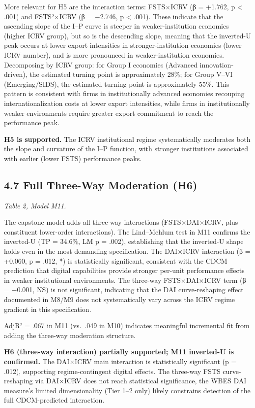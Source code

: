 \documentclass[
  12pt]{article}
\begin{document}
More relevant for H5 are the interaction terms: FSTS×ICRV (β = +1.762, p
\textless{} .001) and FSTS²×ICRV (β = −2.746, p \textless{} .001). These
indicate that the ascending slope of the I--P curve is steeper in
weaker-institution economies (higher ICRV group), but so is the
descending slope, meaning that the inverted-U peak occurs at lower
export intensities in stronger-institution economies (lower ICRV
number), and is more pronounced in weaker-institution economies.
Decomposing by ICRV group: for Group I economies (Advanced
innovation-driven), the estimated turning point is approximately 28\%;
for Group V--VI (Emerging/SIDS), the estimated turning point is
approximately 55\%. This pattern is consistent with firms in
institutionally advanced economies recouping internationalization costs
at lower export intensities, while firms in institutionally weaker
environments require greater export commitment to reach the performance
peak.

\textbf{H5 is supported.} The ICRV institutional regime systematically
moderates both the slope and curvature of the I--P function, with
stronger institutions associated with earlier (lower FSTS) performance
peaks.

\hypertarget{full-three-way-moderation-h6}{%
\subsection{4.7 Full Three-Way Moderation
(H6)}\label{full-three-way-moderation-h6}}

\emph{Table 2, Model M11.}

The capstone model adds all three-way interactions (FSTS×DAI×ICRV, plus
constituent lower-order interactions). The Lind--Mehlum test in M11
confirms the inverted-U (TP = 34.6\%, LM p = .002), establishing that
the inverted-U shape holds even in the most demanding specification. The
DAI×ICRV interaction (β = +0.060, p = .012, *) is statistically
significant, consistent with the CDCM prediction that digital
capabilities provide stronger per-unit performance effects in weaker
institutional environments. The three-way FSTS×DAI×ICRV term (β =
−0.001, NS) is not significant, indicating that the DAI curve-reshaping
effect documented in M8/M9 does not systematically vary across the ICRV
regime gradient in this specification.

AdjR² = .067 in M11 (vs.~.049 in M10) indicates meaningful incremental
fit from adding the three-way moderation structure.

\textbf{H6 (three-way interaction) partially supported; M11 inverted-U
is confirmed.} The DAI×ICRV main interaction is statistically
significant (p = .012), supporting regime-contingent digital effects.
The three-way FSTS curve-reshaping via DAI×ICRV does not reach
statistical significance, the WBES DAI measure's limited dimensionality
(Tier 1--2 only) likely constrains detection of the full CDCM-predicted
interaction.
\end{document}
